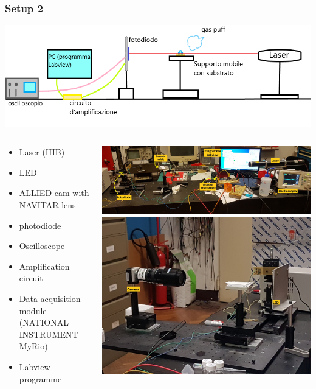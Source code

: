 \documentclass[xcolor=table]{beamer}
\begin{document}
\begin{frame}

\frametitle{Setup 2}
\fontsize{8}{10.2} \selectfont
\includegraphics[width=.8\columnwidth]{setup1.png}


\begin{columns}
	\begin{column}{.45\textwidth}
		\begin{itemize}
			\item Laser (IIIB)
			\item LED
			\item ALLIED cam with NAVITAR lens
			\item photodiode
			\item Oscilloscope
			\item Amplification circuit
			\item Data acquisition module (NATIONAL INSTRUMENT MyRio)
			\item Labview programme
		\end{itemize}
		
		
	\end{column}
	\begin{column}{.6\textwidth}
		\centering
	\includegraphics[width=.7\columnwidth]{20200707_124708.jpg}\\
	\includegraphics[width=.6\columnwidth]{20200722_105635.jpg}\\	
	\end{column}
\end{columns}

\end{frame}
\end{document}
